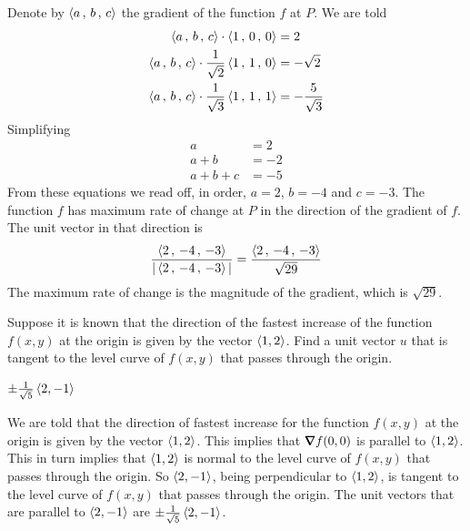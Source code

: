 \begin{solution}
Denote by $\left< a\,,\,b\,,\,c\right>$ the gradient of the function $f$ at
$P$. We are told
\begin{align*}
\left< a\,,\,b\,,\,c\right> \cdot \left< 1\,,\,0\,,\,0\right> &= 2 \\
\left< a\,,\,b\,,\,c\right> \cdot \frac{1}{\sqrt{2}}\left< 1\,,\,1\,,\,0\right> &= -\sqrt{2} \\
\left< a\,,\,b\,,\,c\right> \cdot \frac{1}{\sqrt{3}}\left< 1\,,\,1\,,\,1\right> &= -\frac{5}{\sqrt{3}}
\end{align*}
Simplifying
\begin{align*}
a&=2 \\
a+b&=-2 \\
a+b+c&=-5
\end{align*}
From these equations we read off, in order,
$a=2$, $b=-4$ and $c=-3$.
The function $f$ has maximum rate of change at $P$ in the 
direction of the gradient of $f$. The unit vector in that direction is
\begin{equation*}
\frac{\left< 2\,,\,-4\,,\,-3\right>}{|\left< 2\,,\,-4\,,\,-3\right>|}
=\frac{\left< 2\,,\,-4\,,\,-3\right>}{\sqrt{29}}
\end{equation*}
The maximum rate of change is the magnitude of the gradient, which is
$\sqrt{29}$.
\end{solution}

\begin{question}[M200 2013D] %
Suppose it is known that the direction of the fastest increase of the 
function $f(x,y)$ at the origin is given by the vector $\left< 1, 2\right>$. 
Find a unit vector $u$ that is tangent to the level curve of $f(x,y)$ 
that passes through the origin.
\end{question}

%

\begin{answer}
$\pm\frac{1}{\sqrt{5}}\left< 2, -1\right>$
\end{answer}

\begin{solution}
We are told that the direction of fastest increase for the 
function $f(x,y)$ at the origin is given by the vector $\left< 1, 2\right>$.
This implies that $\vnabla f(0,0)$ is parallel to $\left< 1, 2\right>$.
This in turn implies that $\left< 1, 2\right>$ is normal to the level curve
of $f(x,y)$ that passes through the origin. So $\left< 2, -1\right>$, being 
perpendicular to $\left< 1, 2\right>$,  is tangent to the level curve of 
$f(x,y)$ that passes through the origin.
The unit vectors that are parallel to $\left< 2, -1\right>$
are $\pm\frac{1}{\sqrt{5}}\left< 2, -1\right>$.
\end{solution}

